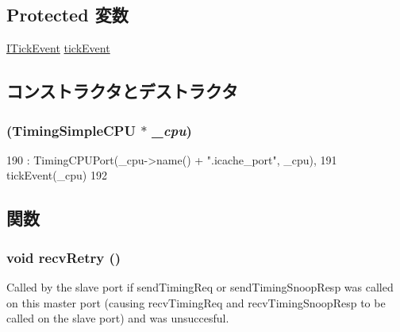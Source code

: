 \subsection*{Protected 変数}
\begin{DoxyCompactItemize}
\item 
\hyperlink{structTimingSimpleCPU_1_1IcachePort_1_1ITickEvent}{ITickEvent} \hyperlink{classTimingSimpleCPU_1_1IcachePort_a799a54dae0252f08692ee951528144dc}{tickEvent}
\end{DoxyCompactItemize}


\subsection{コンストラクタとデストラクタ}
\hypertarget{classTimingSimpleCPU_1_1IcachePort_aecbabb77fb044c96b054b9e97ab47863}{
\subsubsection[{IcachePort}]{ ({\bf TimingSimpleCPU} $\ast$ {\em \_\-cpu})}}
\label{classTimingSimpleCPU_1_1IcachePort_aecbabb77fb044c96b054b9e97ab47863}



\begin{DoxyCode}
190             : TimingCPUPort(_cpu->name() + ".icache_port", _cpu),
191               tickEvent(_cpu)
192         { }
\end{DoxyCode}


\subsection{関数}
\hypertarget{classTimingSimpleCPU_1_1IcachePort_a29cb5a4f98063ce6e9210eacbdb35298}{
\subsubsection[{recvRetry}]{\setlength{\rightskip}{0pt plus 5cm}void recvRetry ()}}
\label{classTimingSimpleCPU_1_1IcachePort_a29cb5a4f98063ce6e9210eacbdb35298}
Called by the slave port if sendTimingReq or sendTimingSnoopResp was called on this master port (causing recvTimingReq and recvTimingSnoopResp to be called on the slave port) and was unsuccesful. 


